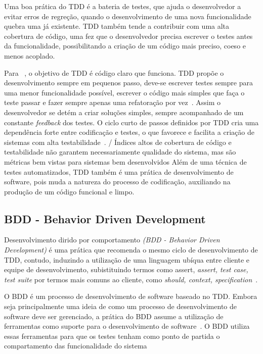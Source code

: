 Uma boa prática do TDD é a bateria de testes, que ajuda o desenvolvedor a evitar 
erros de regreção, quando o desenvolvimento de uma nova funcionalidade quebra uma 
já existente.
%
TDD também tende a contribuir com uma alta cobertura de código, uma 
fez que o desenvolvedor precisa escrever o testes antes da funcionalidade, 
possibilitando a criação de um código mais preciso, coeso e menos acoplado. 

Para ~, o objetivo de TDD é código claro que 
funciona.
%
TDD propõe o desenvolvimento sempre em pequenos passo, deve-se escrever testes sempre 
para uma menor funcionalidade possível, escrever o código mais simples que faça o 
teste passar e fazer sempre apenas uma refatoração por vez~. Assim o 
desenvolvedor se detém a criar soluções simples, sempre acompanhado de um constante 
\textit{feedback} dos testes.
%
O ciclo curto de passos definidos por TDD cria uma dependência forte entre codificação 
e testes, o que favorece e facilita a criação de sistemas com alta testabilidade~\cite{bernardo2011}. 
/%
Índices altos de cobertura de código e testabilidade não garantem necessariamente 
qualidade do sistema, mas são métricas bem vistas para sistemas bem desenvolvidos
%
Além de uma técnica de testes automatizados, TDD também é uma prática de desenvolvimento 
de software, pois muda a natureza do processo de codificação, auxiliando na produção 
de um código funcional e limpo.
%

\subsection{BDD - Behavior Driven Development}

Desenvolvimento dirido por comportamento \textit{(BDD - Behavior Driven Development)} 
é uma prática que recomenda o mesmo ciclo de desenvolvimento de TDD, contudo, induzindo 
a utilização de uma linguagem ubíqua entre cliente e equipe de desenvolvimento, subistituindo termos como assert, \textit{assert, test case, test suite} por termos 
mais comuns ao cliente, como \textit{should, context, specification}~\cite{bernardo2011}.

O BDD é um processo de desenvolvimento de software baseado no TDD. Embora seja 
principalmente uma ideia de como um processo de desenvolvimento de 
software deve ser gerenciado, a prática do BDD assume a utilização de ferramentas 
como suporte para o desenvolvimento de software~\cite{haring2011}. O BDD utiliza 
essas ferramentas para que os testes tenham como ponto de partida o compartamento 
das funcionalidade do sistema

